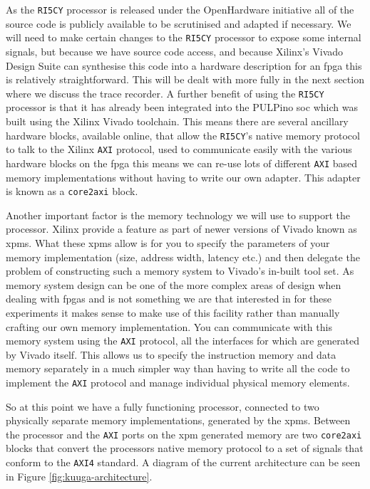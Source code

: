 As the \texttt{RI5CY} processor is released under the OpenHardware \cite{OpenSourceHardware} initiative all of the source code is publicly available to be scrutinised and adapted if necessary. We will need to make certain changes to the \texttt{RI5CY} processor to expose some internal signals, but because we have source code access, and because Xilinx's Vivado Design Suite can synthesise this code into a hardware description for an \gls{fpga} this is relatively straightforward. This will be dealt with more fully in the next section where we discuss the trace recorder. A further benefit of using the \texttt{RI5CY} processor is that it has already been integrated into the PULPino \cite{traberPULPinoDatasheet2017} \gls{soc} which was built using the Xilinx Vivado toolchain. This means there are several ancillary hardware blocks, available online, that allow the \texttt{RI5CY}'s native memory protocol to talk to the Xilinx \texttt{AXI} protocol, used to communicate easily with the various hardware blocks on the \gls{fpga} this means we can re-use lots of different \texttt{AXI} based memory implementations without having to write our own adapter. This adapter is known as a \texttt{core2axi} block. 

Another important factor is the memory technology we will use to support the processor. Xilinx provide a feature as part of newer versions of Vivado known as \glspl{xpm}\cite{UG974UltraScaleArchitecture2018}. What these \glspl{xpm} allow is for you to specify the parameters of your memory implementation (size, address width, latency etc.) and then delegate the problem of constructing such a memory system to Vivado's in-built tool set. As memory system design can be one of the more complex areas of design when dealing with \glspl{fpga} and is not something we are that interested in for these experiments it makes sense to make use of this facility rather than manually crafting our own memory implementation. You can communicate with this memory system using the \texttt{AXI} protocol\cite{AMBAAXIACE2013}, all the interfaces for which are generated by Vivado itself. This allows us to specify the instruction memory and data memory separately in a much simpler way than having to write all the code to implement the \texttt{AXI} protocol and manage individual physical memory elements. 

So at this point we have a fully functioning processor, connected to two physically separate memory implementations, generated by the \glspl{xpm}. Between the processor and the \texttt{AXI} ports on the \gls{xpm} generated memory are two \texttt{core2axi} blocks that convert the processors native memory protocol to a set of signals that conform to the \texttt{AXI4} standard. A diagram of the current architecture can be seen in Figure \ref{fig:kuuga-architecture}.

